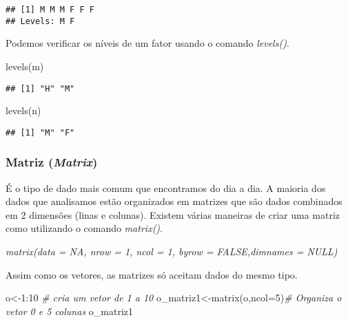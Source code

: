 \documentclass[
]{book}
\newenvironment{Shaded}{\begin{snugshade}}{\end{snugshade}}
\newcommand{\AttributeTok}[1]{\textcolor[rgb]{0.77,0.63,0.00}{#1}}
\newcommand{\CommentTok}[1]{\textcolor[rgb]{0.56,0.35,0.01}{\textit{#1}}}
\newcommand{\DecValTok}[1]{\textcolor[rgb]{0.00,0.00,0.81}{#1}}
\newcommand{\FunctionTok}[1]{\textcolor[rgb]{0.00,0.00,0.00}{#1}}
\newcommand{\NormalTok}[1]{#1}
\newcommand{\OtherTok}[1]{\textcolor[rgb]{0.56,0.35,0.01}{#1}}
\newcommand{\SpecialCharTok}[1]{\textcolor[rgb]{0.00,0.00,0.00}{#1}}
\begin{document}
\begin{verbatim}
## [1] M M M F F F
## Levels: M F
\end{verbatim}

Podemos verificar os níveis de um fator usando o comando \emph{levels()}.

\begin{Shaded}
\begin{Highlighting}[]
\FunctionTok{levels}\NormalTok{(m)}
\end{Highlighting}
\end{Shaded}

\begin{verbatim}
## [1] "H" "M"
\end{verbatim}

\begin{Shaded}
\begin{Highlighting}[]
\FunctionTok{levels}\NormalTok{(n)}
\end{Highlighting}
\end{Shaded}

\begin{verbatim}
## [1] "M" "F"
\end{verbatim}

\hypertarget{matriz-matrix}{%
\subsubsection{\texorpdfstring{Matriz (\emph{Matrix})}{Matriz (Matrix)}}\label{matriz-matrix}}

É o tipo de dado mais comum que encontramos do dia a dia. A maioria dos dados que analisamos estão organizados em matrizes que são dados combinados em 2 dimensões (linas e colunas).
Existem várias maneiras de criar uma matriz como utilizando o comando \emph{matrix()}.

\emph{\emph{matrix(data = NA, nrow = 1, ncol = 1, byrow = FALSE,dimnames = NULL)}}

Assim como os vetores, as matrizes só aceitam dados do mesmo tipo.

\begin{Shaded}
\begin{Highlighting}[]
\NormalTok{o}\OtherTok{\textless{}{-}}\DecValTok{1}\SpecialCharTok{:}\DecValTok{10} \CommentTok{\# cria um vetor de 1 a 10}
\NormalTok{o\_matriz1}\OtherTok{\textless{}{-}}\FunctionTok{matrix}\NormalTok{(o,}\AttributeTok{ncol=}\DecValTok{5}\NormalTok{)}\CommentTok{\# Organiza o vetor 0 e 5 colunas}
\NormalTok{o\_matriz1}
\end{Highlighting}
\end{Shaded}
\end{document}

